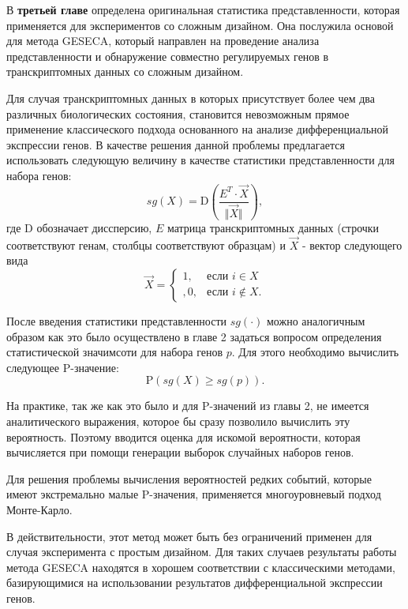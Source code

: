 

В \textbf{третьей главе} определена оригинальная статистика представленности, которая применяется для экспериментов со сложным дизайном.
Она послужила основой для метода GESECA, который направлен на проведение анализа представленности и обнаружение совместно регулируемых генов в транскриптомных данных со сложным дизайном.

Для случая транскриптомных данных в которых присутствует более чем два различных биологических состояния, становится невозможным прямое применение классического подхода основанного на анализе дифференциальной экспрессии генов. В качестве решения данной проблемы предлагается использовать следующую величину в качестве статистики представленности для набора генов:
\[
       sg(X) = \mathrm{D} \left(\frac{E^T \cdot \overrightarrow{X}}{\Vert \overrightarrow{X} \Vert}\right),
\]
где $\mathrm{D}$ обозначает диссперсию, $E$ матрица транскриптомных данных (строчки соответствуют генам, столбцы соответствуют образцам) и $\overrightarrow{X}$ - вектор следующего вида
\[
    \overrightarrow{X} = \begin{cases}
        1, & \text{если } i \in X \\,
        0, & \text{если } i \not\in X.
    \end{cases}
\]

После введения статистики представленности $sg(\cdot)$ можно аналогичным образом как это было осуществлено в главе 2 задаться вопросом определения статистической значимсоти для набора генов $p$.
Для этого необходимо вычислить следующее P-значение:
\[
    \mathrm{P} \left( sg(X) \geqslant sg(p) \right). 
\] 

На практике, так же как это было и для P-значений из главы 2, не имеется аналитического выражения, которое бы сразу позволило вычислить эту вероятность.
Поэтому вводится оценка для искомой вероятности, которая вычисляется при помощи генерации выборок случайных наборов генов.

Для решения проблемы вычисления вероятностей редких событий, которые имеют экстремально малые P-значения, применяется многоуровневый подход Монте-Карло.

В действительности, этот метод может быть без ограничений применен для случая эксперимента с простым дизайном.
Для таких случаев результаты работы метода GESECA находятся в хорошем соответствии с классическими методами, базирующимися на использовании результатов дифференциальной экспрессии генов.

